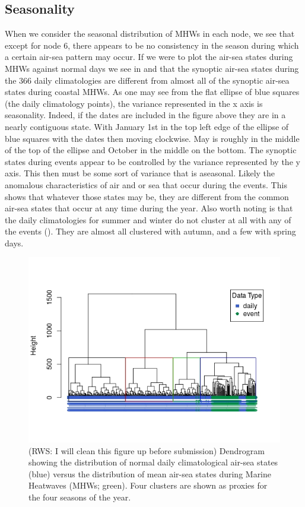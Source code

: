 \documentclass[a4paper,10pt,review]{elsarticle}
\begin{document}
\subsection{Seasonality}
When we consider the seasonal distribution of MHWs in each node, we see that except for node 6, there appears to be no consistency in the season during which a certain air-sea pattern may occur. If we were to plot the air-sea states during MHWs against normal days we see in  and  that the synoptic air-sea states during the 366 daily climatologies are different from almost all of the synoptic air-sea states during coastal MHWs. As one may see from the flat ellipse of blue squares (the daily climatology points), the variance represented in the x axis is seasonality. Indeed, if the dates are included in the figure above they are in a nearly contiguous state. With January 1st in the top left edge of the ellipse of blue squares with the dates then moving clockwise. May is roughly in the middle of the top of the ellipse and October in the middle on the bottom. The synoptic states during events appear to be controlled by the variance represented by the y axis. This then must be some sort of variance that is aseasonal. Likely the anomalous characteristics of air and or sea that occur during the events. This shows that whatever those states may be, they are different from the common air-sea states that occur at any time during the year. Also worth noting is that the daily climatologies for summer and winter do not cluster at all with any of the events (). They are almost all clustered with autumn, and a few with spring days.

\begin{figure}
\includegraphics[width=1.0\textwidth]{figure_6.jpeg}
\caption{(RWS: I will clean this figure up before submission) Dendrogram showing the distribution of normal daily climatological air-sea states (blue) versus the distribution of mean air-sea states during Marine Heatwaves (MHWs; green). Four clusters are shown as proxies for the four seasons of the year.}
\label{figure6}
\end{figure}
\end{document}
